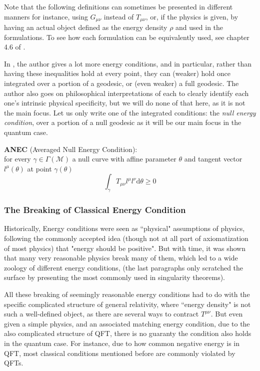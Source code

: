 \documentclass[a4paper,11pt]{article}
\numberwithin{equation}{section}
\theoremstyle{definition}
\renewcommand{\d}{{\mathrm{d}}}
\begin{document}
Note that the following definitions can sometimes be presented in different manners for instance, using $G_{\mu\nu}$ instead of $T_{\mu\nu}$, or, if the physics is given, by having an actual object defined as the energy density $\rho$ and used in the formulations. To see how each formulation can be equivalently used, see chapter 4.6 of \cite{E_Cond}.

In \cite{Primer}, the author gives a lot more energy conditions, and in particular, rather than having these inequalities hold at every point, they can (weaker) hold once integrated over a portion of a geodesic, or (even weaker) a full geodesic. The author also goes on philosophical interpretations of each to clearly identify each one's intrinsic physical specificity, but we will do none of that here, as it is not the main focus. Let us only write one of the integrated conditions: the \emph{null energy condition}, over a portion of a null geodesic as it will be our main focus in the quantum case.

\textbf{ANEC} (Averaged Null Energy Condition):\\
for every $\gamma\in\Gamma(\mathcal{M})$ a null curve with affine parameter $\theta$ and tangent vector $l^\mu(\theta)$ at point $\gamma(\theta)$
\begin{equation}
    \int_\gamma T_{\mu\nu}l^\mu l^\nu\d\theta \geq 0
\end{equation}
\subsubsection{The Breaking of Classical Energy Condition}
Historically, Energy conditions were seen as ``physical" assumptions of physics, following the commonly accepted idea (though not at all part of axiomatization of most physics) that "energy should be positive". But with time, it was shown that many very reasonable physics break many of them, which led to a wide zoology of different energy conditions, (the last paragraphs only scratched the surface by presenting the most commonly used in singularity theorems).

All these breaking of seemingly reasonable energy conditions had to do with the specific complicated structure of general relativity, where ``energy density" is not such a well-defined object, as there are several ways to contract $T^{\mu\nu}$. But even given a simple physics, and an associated matching energy condition, due to the also complicated structure of QFT, there is no guaranty the condition also holds in the quantum case. For instance, due to how common negative energy is in QFT, most classical conditions mentioned before are commonly violated by QFTs.
\end{document}
